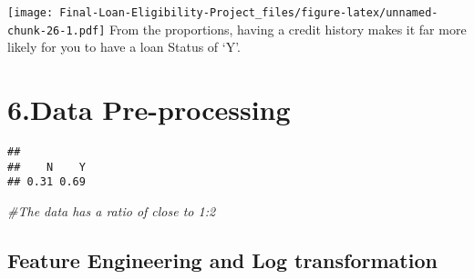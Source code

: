 \documentclass[
]{article}
\newenvironment{Shaded}{\begin{snugshade}}{\end{snugshade}}
\newcommand{\CommentTok}[1]{\textcolor[rgb]{0.56,0.35,0.01}{\textit{#1}}}
\newcommand{\DecValTok}[1]{\textcolor[rgb]{0.00,0.00,0.81}{#1}}
\newcommand{\FunctionTok}[1]{\textcolor[rgb]{0.00,0.00,0.00}{#1}}
\newcommand{\NormalTok}[1]{#1}
\newcommand{\SpecialCharTok}[1]{\textcolor[rgb]{0.00,0.00,0.00}{#1}}
\begin{document}
\texttt{[image: Final-Loan-Eligibility-Project\_files/figure-latex/unnamed-chunk-26-1.pdf]}
From the proportions, having a credit history makes it far more likely
for you to have a loan Status of `Y'.

\hypertarget{data-pre-processing}{%
\section{6.Data Pre-processing}\label{data-pre-processing}}

\begin{Shaded}
\end{Shaded}

\begin{verbatim}
## 
##    N    Y 
## 0.31 0.69
\end{verbatim}

\begin{Shaded}
\begin{Highlighting}[]
\CommentTok{\#The data has a ratio of close to 1:2}
\end{Highlighting}
\end{Shaded}

\hypertarget{feature-engineering-and-log-transformation}{%
\subsection{Feature Engineering and Log
transformation}\label{feature-engineering-and-log-transformation}}
\end{document}
